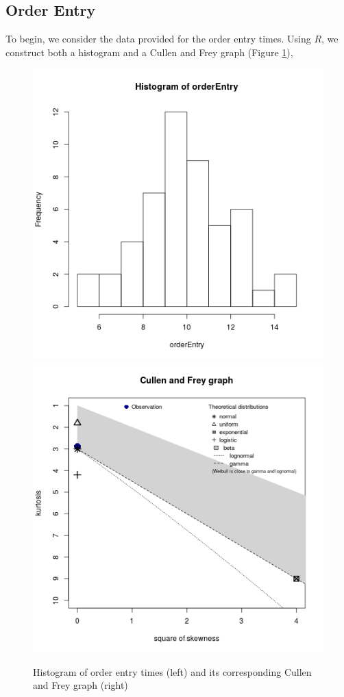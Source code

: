 \documentclass[10pt]{report}            %
\begin{document}
\subsection*{Order Entry}
To begin, we consider the data provided for the order entry times. Using $R$, we construct both a histogram and a Cullen and Frey graph (Figure \ref{fig:orderEntryHistCullen}),
\begin{figure}[H]
\centering
\includegraphics[scale=.35]{OrderEntryHist.png}
\includegraphics[scale=.35]{OrderEntryCullen.png}
\caption{Histogram of order entry times (left) and its corresponding Cullen and Frey graph (right)}
\label{fig:orderEntryHistCullen}
\end{figure}
\end{document}
